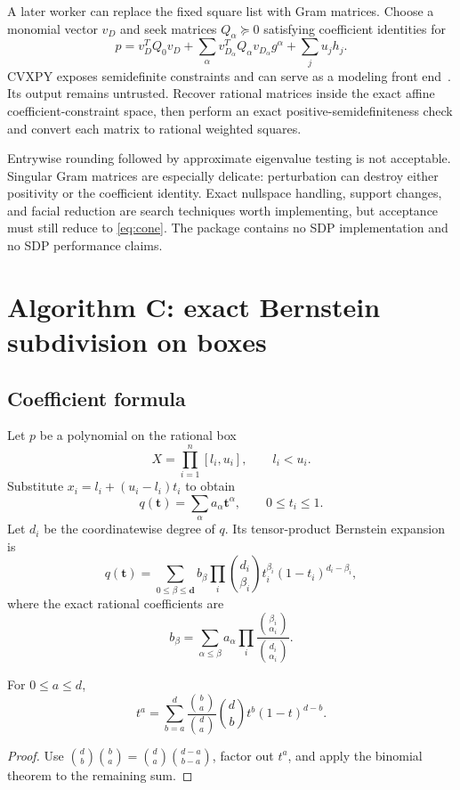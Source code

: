 A later worker can replace the fixed square list with Gram matrices. Choose a monomial vector $v_D$ and seek matrices $Q_\alpha\succeq0$ satisfying coefficient identities for
\[
 p= v_D^TQ_0v_D+
     \sum_\alpha v_{D_\alpha}^TQ_\alpha v_{D_\alpha}g^\alpha
     +\sum_j u_jh_j.
\]
CVXPY exposes semidefinite constraints and can serve as a modeling front end~\cite{cvxpy}. Its output remains untrusted. Recover rational matrices inside the exact affine coefficient-constraint space, then perform an exact positive-semidefiniteness check and convert each matrix to rational weighted squares.

Entrywise rounding followed by approximate eigenvalue testing is not acceptable. Singular Gram matrices are especially delicate: perturbation can destroy either positivity or the coefficient identity. Exact nullspace handling, support changes, and facial reduction are search techniques worth implementing, but acceptance must still reduce to \eqref{eq:cone}. The package contains no SDP implementation and no SDP performance claims.

\section{Algorithm C: exact Bernstein subdivision on boxes}

\subsection{Coefficient formula}

Let $p$ be a polynomial on the rational box
\[
 X=\prod_{i=1}^{n}[l_i,u_i],\qquad l_i<u_i.
\]
Substitute $x_i=l_i+(u_i-l_i)t_i$ to obtain
\[
 q(\bm t)=\sum_\alpha a_\alpha\bm t^\alpha,
 \qquad 0\le t_i\le1.
\]
Let $d_i$ be the coordinatewise degree of $q$. Its tensor-product Bernstein expansion is
\[
 q(\bm t)=\sum_{0\le\beta\le\bm d} b_\beta
   \prod_i\binom{d_i}{\beta_i}t_i^{\beta_i}(1-t_i)^{d_i-\beta_i},
\]
where the exact rational coefficients are
\begin{equation}
 b_\beta=\sum_{\alpha\le\beta}a_\alpha
     \prod_i\frac{\binom{\beta_i}{\alpha_i}}{\binom{d_i}{\alpha_i}}.
 \label{eq:bernstein}
\end{equation}

\begin{lemma}
For $0\le a\le d$,
\[
 t^a=\sum_{b=a}^{d}\frac{\binom ba}{\binom da}
                    \binom db t^b(1-t)^{d-b}.
\]
\end{lemma}
\begin{proof}
Use $\binom db\binom ba=\binom da\binom{d-a}{b-a}$, factor out $t^a$, and apply the binomial theorem to the remaining sum.
\end{proof}

